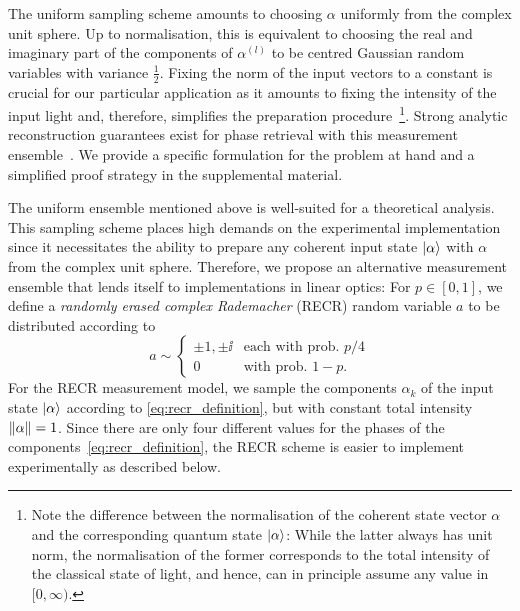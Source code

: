 The uniform sampling scheme amounts to choosing $ \alpha$ uniformly from the complex unit sphere.
Up to normalisation, this is equivalent to choosing the real and imaginary part of the components of $\alpha^{(l)}$ to be centred Gaussian random variables with variance $\tfrac{1}{2}$.
Fixing the norm of the input vectors to a constant is crucial for our particular application as it amounts to fixing the intensity of the input light and, therefore, simplifies the preparation procedure~\footnote{%
  Note the difference between the normalisation of the coherent state vector $\alpha$ and the corresponding quantum state ${|{\alpha}\rangle}$:
  While the latter always has unit norm, the normalisation of the former corresponds to the total intensity of the classical state of light, and hence, can in principle assume any value in $[0,\infty)$.
}.
Strong analytic reconstruction guarantees exist for phase retrieval with this measurement ensemble~\cite{candes_solving_2012, tropp_convex_2015, kueng_low_2014}.
We provide a specific formulation for the problem at hand and a simplified proof strategy in the supplemental material.

The uniform ensemble mentioned above is well-suited for a theoretical analysis.
This sampling scheme places high demands on the experimental implementation since it necessitates the ability to prepare any coherent input state $\ket{ \alpha}$ with $\alpha$ from the complex unit sphere.
Therefore, we propose an alternative measurement ensemble that lends itself to implementations in linear optics:
For $p \in [0,1]$, we define a \emph{randomly erased complex Rademacher} (RECR) random variable $a$ to be distributed according to
\[
  a \sim
  \begin{cases}
    \pm 1, \pm \ii & \textrm{each with prob. } p/4 \\
    0 & \textrm{with prob. } 1 - p.
  \end{cases}
  \label{eq:recr_definition}
\]
For the RECR measurement model, we sample the components $\alpha_k$ of the input state $\ket{ \alpha}$ according to \cref{eq:recr_definition}, but with constant total intensity ${\Vert\alpha\Vert} = 1$.
Since there are only four different values for the phases of the components~\eqref{eq:recr_definition}, the RECR scheme is easier to implement experimentally as described below.

